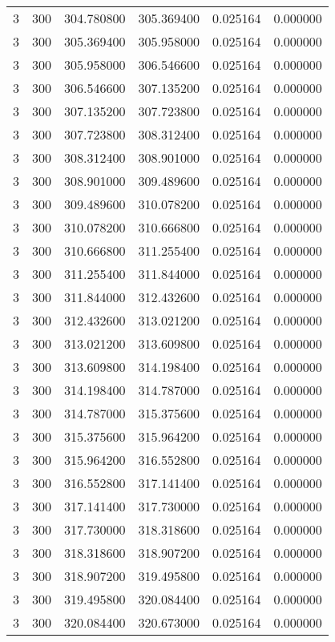 \begin{longtable}{rrrrrr}
3 & 300 & 304.780800 & 305.369400 & 0.025164 & 0.000000 \\
3 & 300 & 305.369400 & 305.958000 & 0.025164 & 0.000000 \\
3 & 300 & 305.958000 & 306.546600 & 0.025164 & 0.000000 \\
3 & 300 & 306.546600 & 307.135200 & 0.025164 & 0.000000 \\
3 & 300 & 307.135200 & 307.723800 & 0.025164 & 0.000000 \\
3 & 300 & 307.723800 & 308.312400 & 0.025164 & 0.000000 \\
3 & 300 & 308.312400 & 308.901000 & 0.025164 & 0.000000 \\
3 & 300 & 308.901000 & 309.489600 & 0.025164 & 0.000000 \\
3 & 300 & 309.489600 & 310.078200 & 0.025164 & 0.000000 \\
3 & 300 & 310.078200 & 310.666800 & 0.025164 & 0.000000 \\
3 & 300 & 310.666800 & 311.255400 & 0.025164 & 0.000000 \\
3 & 300 & 311.255400 & 311.844000 & 0.025164 & 0.000000 \\
3 & 300 & 311.844000 & 312.432600 & 0.025164 & 0.000000 \\
3 & 300 & 312.432600 & 313.021200 & 0.025164 & 0.000000 \\
3 & 300 & 313.021200 & 313.609800 & 0.025164 & 0.000000 \\
3 & 300 & 313.609800 & 314.198400 & 0.025164 & 0.000000 \\
3 & 300 & 314.198400 & 314.787000 & 0.025164 & 0.000000 \\
3 & 300 & 314.787000 & 315.375600 & 0.025164 & 0.000000 \\
3 & 300 & 315.375600 & 315.964200 & 0.025164 & 0.000000 \\
3 & 300 & 315.964200 & 316.552800 & 0.025164 & 0.000000 \\
3 & 300 & 316.552800 & 317.141400 & 0.025164 & 0.000000 \\
3 & 300 & 317.141400 & 317.730000 & 0.025164 & 0.000000 \\
3 & 300 & 317.730000 & 318.318600 & 0.025164 & 0.000000 \\
3 & 300 & 318.318600 & 318.907200 & 0.025164 & 0.000000 \\
3 & 300 & 318.907200 & 319.495800 & 0.025164 & 0.000000 \\
3 & 300 & 319.495800 & 320.084400 & 0.025164 & 0.000000 \\
3 & 300 & 320.084400 & 320.673000 & 0.025164 & 0.000000 \\

\end{longtable}
